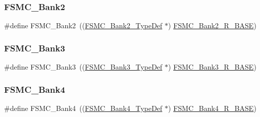 \subsubsection{\texorpdfstring{FSMC\_Bank2}{FSMC\_Bank2}}
{\footnotesize\ttfamily \#define F\+S\+M\+C\+\_\+\+Bank2~((\mbox{\hyperlink{struct_f_s_m_c___bank2___type_def}{F\+S\+M\+C\+\_\+\+Bank2\+\_\+\+Type\+Def}} $\ast$) \mbox{\hyperlink{group___peripheral__memory__map_ga3cb46d62f4f6458e186a5a4c753e4918}{F\+S\+M\+C\+\_\+\+Bank2\+\_\+\+R\+\_\+\+B\+A\+SE}})}

\mbox{\label{group___peripheral__declaration_ga411eedc00b5b2b22b494004d4f41b736}} 
\subsubsection{\texorpdfstring{FSMC\_Bank3}{FSMC\_Bank3}}
{\footnotesize\ttfamily \#define F\+S\+M\+C\+\_\+\+Bank3~((\mbox{\hyperlink{struct_f_s_m_c___bank3___type_def}{F\+S\+M\+C\+\_\+\+Bank3\+\_\+\+Type\+Def}} $\ast$) \mbox{\hyperlink{group___peripheral__memory__map_gacf056152c9e5aefcc67db78d1302c0d7}{F\+S\+M\+C\+\_\+\+Bank3\+\_\+\+R\+\_\+\+B\+A\+SE}})}

\mbox{\label{group___peripheral__declaration_ga5aa00e4ac522693c6a21bc23ef5a96df}} 
\subsubsection{\texorpdfstring{FSMC\_Bank4}{FSMC\_Bank4}}
{\footnotesize\ttfamily \#define F\+S\+M\+C\+\_\+\+Bank4~((\mbox{\hyperlink{struct_f_s_m_c___bank4___type_def}{F\+S\+M\+C\+\_\+\+Bank4\+\_\+\+Type\+Def}} $\ast$) \mbox{\hyperlink{group___peripheral__memory__map_gaf9e5417133160b0bdd0498d982acec19}{F\+S\+M\+C\+\_\+\+Bank4\+\_\+\+R\+\_\+\+B\+A\+SE}})}

\mbox{\label{group___peripheral__declaration_gac485358099728ddae050db37924dd6b7}} 
